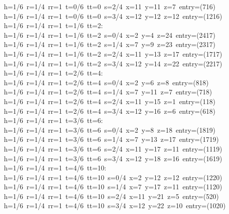 \begin{tabbing}
h=1/6\ r=1/4\ rr=1\ t=0/6\ tt=0\ s=2/4\ x=11\ y=11\ z=7\ entry=(716)\\[0pt]
h=1/6\ r=1/4\ rr=1\ t=0/6\ tt=0\ s=3/4\ x=12\ y=12\ z=12\ entry=(1216)\\[0pt]
h=1/6\ r=1/4\ rr=1\ t=1/6\ tt=2:\\[0pt]
h=1/6\ r=1/4\ rr=1\ t=1/6\ tt=2\ s=0/4\ x=2\ y=4\ z=24\ entry=(2417)\\[0pt]
h=1/6\ r=1/4\ rr=1\ t=1/6\ tt=2\ s=1/4\ x=7\ y=9\ z=23\ entry=(2317)\\[0pt]
h=1/6\ r=1/4\ rr=1\ t=1/6\ tt=2\ s=2/4\ x=11\ y=13\ z=17\ entry=(1717)\\[0pt]
h=1/6\ r=1/4\ rr=1\ t=1/6\ tt=2\ s=3/4\ x=12\ y=14\ z=22\ entry=(2217)\\[0pt]
h=1/6\ r=1/4\ rr=1\ t=2/6\ tt=4:\\[0pt]
h=1/6\ r=1/4\ rr=1\ t=2/6\ tt=4\ s=0/4\ x=2\ y=6\ z=8\ entry=(818)\\[0pt]
h=1/6\ r=1/4\ rr=1\ t=2/6\ tt=4\ s=1/4\ x=7\ y=11\ z=7\ entry=(718)\\[0pt]
h=1/6\ r=1/4\ rr=1\ t=2/6\ tt=4\ s=2/4\ x=11\ y=15\ z=1\ entry=(118)\\[0pt]
h=1/6\ r=1/4\ rr=1\ t=2/6\ tt=4\ s=3/4\ x=12\ y=16\ z=6\ entry=(618)\\[0pt]
h=1/6\ r=1/4\ rr=1\ t=3/6\ tt=6:\\[0pt]
h=1/6\ r=1/4\ rr=1\ t=3/6\ tt=6\ s=0/4\ x=2\ y=8\ z=18\ entry=(1819)\\[0pt]
h=1/6\ r=1/4\ rr=1\ t=3/6\ tt=6\ s=1/4\ x=7\ y=13\ z=17\ entry=(1719)\\[0pt]
h=1/6\ r=1/4\ rr=1\ t=3/6\ tt=6\ s=2/4\ x=11\ y=17\ z=11\ entry=(1119)\\[0pt]
h=1/6\ r=1/4\ rr=1\ t=3/6\ tt=6\ s=3/4\ x=12\ y=18\ z=16\ entry=(1619)\\[0pt]
h=1/6\ r=1/4\ rr=1\ t=4/6\ tt=10:\\[0pt]
h=1/6\ r=1/4\ rr=1\ t=4/6\ tt=10\ s=0/4\ x=2\ y=12\ z=12\ entry=(1220)\\[0pt]
h=1/6\ r=1/4\ rr=1\ t=4/6\ tt=10\ s=1/4\ x=7\ y=17\ z=11\ entry=(1120)\\[0pt]
h=1/6\ r=1/4\ rr=1\ t=4/6\ tt=10\ s=2/4\ x=11\ y=21\ z=5\ entry=(520)\\[0pt]
h=1/6\ r=1/4\ rr=1\ t=4/6\ tt=10\ s=3/4\ x=12\ y=22\ z=10\ entry=(1020)\\[0pt]

\end{tabbing}
